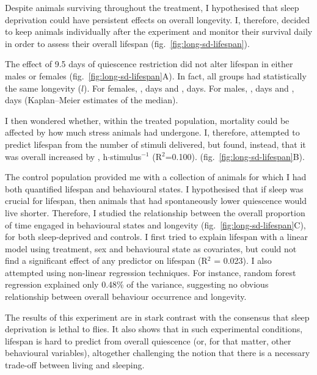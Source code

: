 Despite animals surviving throughout the treatment, I hypothesised that sleep deprivation could have persistent effects on overall longevity.
I, therefore, decided to keep animals individually after the experiment and monitor their survival daily in order to assess their overall lifespan (fig.~\ref{fig:long-sd-lifespan}).



The effect of 9.5 days of quiescence restriction did not alter lifespan in either males or females (fig.~\ref{fig:long-sd-lifespan}A). 
In fact, all groups had statistically the same longevity ($l$).
For females, 
, days and
, days.
For males, 
, days and
, days (Kaplan–Meier estimates of the median).

I then wondered whether, within the treated population, mortality could be affected by how much stress animals had undergone.
I, therefore, attempted to predict lifespan from the number of stimuli delivered, 
but found, instead, that it was overall increased by , h$\cdot$stimulus$^{-1}$ (R$^2$=0.100).
(fig.~\ref{fig:long-sd-lifespan}B).


The control population provided me with a collection of animals for which I had both quantified lifespan and behavioural states.
I hypothesised that if sleep was crucial for lifespan, then animals that had spontaneously lower quiescence would live shorter.
Therefore, I studied the relationship between the overall proportion of time engaged in behavioural states and longevity (fig.~\ref{fig:long-sd-lifespan}C), for both sleep-deprived and controls.
I first tried to explain lifespan with a linear model using treatment, sex and behavioural state as covariates, but could not find a significant effect of any predictor on lifespan (R$^2$ =  0.023).
I also attempted using non-linear regression techniques.
For instance, random forest regression\cite{breiman_random_2001}
explained only 0.48\% of the variance, suggesting no obvious relationship between overall behaviour occurrence and longevity.

The results of this experiment are in stark contrast with the consensus that sleep deprivation is lethal to flies. 
It also shows that in such experimental conditions, lifespan is hard to predict from overall quiescence (or, for that matter, other behavioural variables), altogether challenging the notion that there is a necessary trade-off between living and sleeping.


